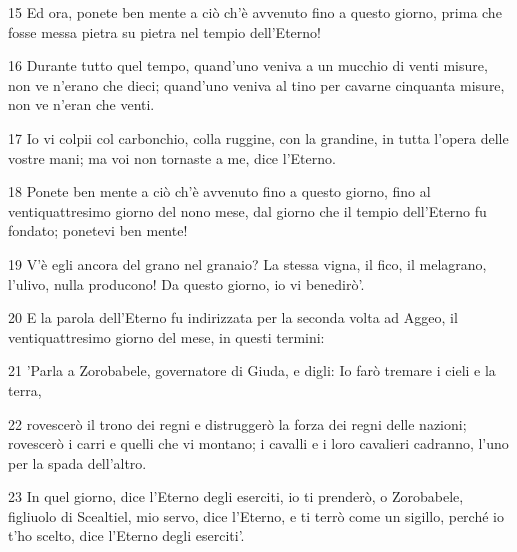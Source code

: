 \par 15 Ed ora, ponete ben mente a ciò ch'è avvenuto fino a questo giorno, prima che fosse messa pietra su pietra nel tempio dell'Eterno!
\par 16 Durante tutto quel tempo, quand'uno veniva a un mucchio di venti misure, non ve n'erano che dieci; quand'uno veniva al tino per cavarne cinquanta misure, non ve n'eran che venti.
\par 17 Io vi colpii col carbonchio, colla ruggine, con la grandine, in tutta l'opera delle vostre mani; ma voi non tornaste a me, dice l'Eterno.
\par 18 Ponete ben mente a ciò ch'è avvenuto fino a questo giorno, fino al ventiquattresimo giorno del nono mese, dal giorno che il tempio dell'Eterno fu fondato; ponetevi ben mente!
\par 19 V'è egli ancora del grano nel granaio? La stessa vigna, il fico, il melagrano, l'ulivo, nulla producono! Da questo giorno, io vi benedirò'.
\par 20 E la parola dell'Eterno fu indirizzata per la seconda volta ad Aggeo, il ventiquattresimo giorno del mese, in questi termini:
\par 21 'Parla a Zorobabele, governatore di Giuda, e digli: Io farò tremare i cieli e la terra,
\par 22 rovescerò il trono dei regni e distruggerò la forza dei regni delle nazioni; rovescerò i carri e quelli che vi montano; i cavalli e i loro cavalieri cadranno, l'uno per la spada dell'altro.
\par 23 In quel giorno, dice l'Eterno degli eserciti, io ti prenderò, o Zorobabele, figliuolo di Scealtiel, mio servo, dice l'Eterno, e ti terrò come un sigillo, perché io t'ho scelto, dice l'Eterno degli eserciti'.


